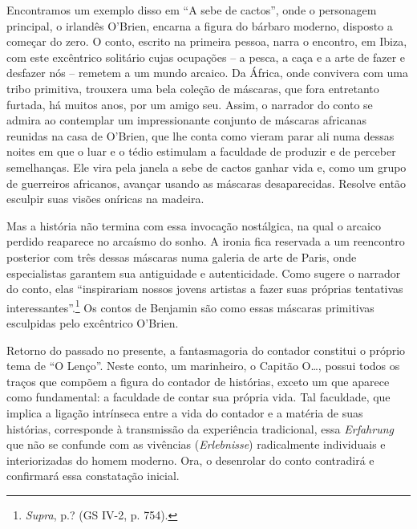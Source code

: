 Encontramos um exemplo disso em ``A sebe de cactos'', onde o personagem
principal, o irlandês O'Brien, encarna a figura do bárbaro moderno,
disposto a começar do zero. O conto, escrito na primeira pessoa, narra o
encontro, em Ibiza, com este excêntrico solitário cujas ocupações -- a
pesca, a caça e a arte de fazer e desfazer nós -- remetem a um mundo
arcaico. Da África, onde convivera com uma tribo primitiva, trouxera uma
bela coleção de máscaras, que fora entretanto furtada, há muitos anos,
por um amigo seu. Assim, o narrador do conto se admira ao contemplar um
impressionante conjunto de máscaras africanas reunidas na casa de
O'Brien, que lhe conta como vieram parar ali numa dessas noites em que o
luar e o tédio estimulam a faculdade de produzir e de perceber
semelhanças. Ele vira pela janela a sebe de cactos ganhar vida e, como
um grupo de guerreiros africanos, avançar usando as máscaras
desaparecidas. Resolve então esculpir suas visões oníricas na madeira.

Mas a história não termina com essa invocação nostálgica, na qual o
arcaico perdido reaparece no arcaísmo do sonho. A ironia fica reservada
a um reencontro posterior com três dessas máscaras numa galeria de arte
de Paris, onde especialistas garantem sua antiguidade e autenticidade.
Como sugere o narrador do conto, elas ``inspirariam nossos jovens artistas a
fazer suas próprias tentativas interessantes''.\footnote{\emph{Supra},
  p.? (GS IV-2, p. 754).} Os contos de Benjamin são como essas máscaras
primitivas esculpidas pelo excêntrico O'Brien.

Retorno do passado no presente, a fantasmagoria do contador constitui o
próprio tema de ``O Lenço''. Neste conto, um marinheiro, o Capitão O\ldots{},
possui todos os traços que compõem a figura do contador de histórias,
exceto um que aparece como fundamental: a faculdade de contar sua
própria vida. Tal faculdade, que implica a ligação intrínseca entre a
vida do contador e a matéria de suas histórias, corresponde à
transmissão da experiência tradicional, essa \emph{Erfahrung} que não se
confunde com as vivências (\emph{Erlebnisse}) radicalmente individuais e
interiorizadas do homem moderno. Ora, o desenrolar do conto contradirá e
confirmará essa constatação inicial.

